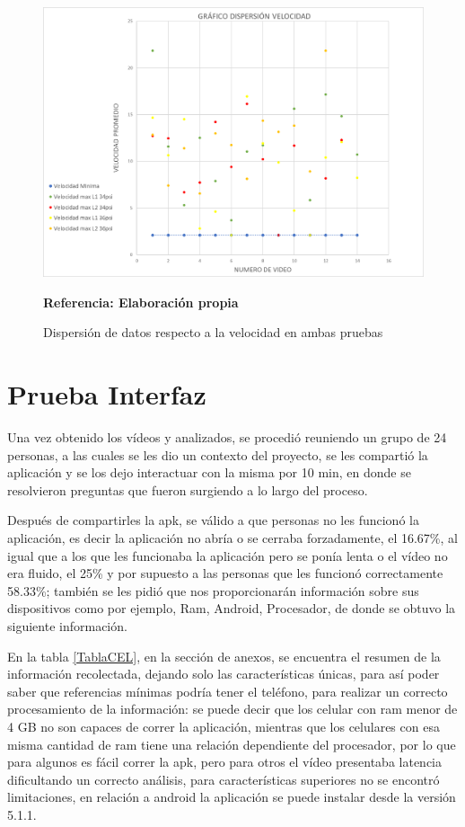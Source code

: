 \documentclass[12pt,twocolumn,a4paper]{article}
\begin{document}
\begin{figure}[h!]

	\centering
	\includegraphics[scale=0.4]{Dispvel.png}
	\caption{Dispersión de datos respecto a la velocidad en ambas pruebas } \textbf{Referencia: Elaboración propia} 
	\label{dispvel}
\end{figure}

\section{Prueba Interfaz}

Una vez obtenido los vídeos y analizados, se procedió reuniendo un grupo de 24 personas, a las cuales se les dio un contexto del proyecto, se les compartió la aplicación y se los dejo interactuar con la misma por 10 min, en donde se resolvieron preguntas que fueron surgiendo a lo largo del proceso.

Después de compartirles la apk, se válido a que personas no les funcionó la aplicación, es decir  la aplicación no abría o se cerraba forzadamente, el 16.67\%, al igual que a los que les funcionaba la aplicación pero se ponía lenta o el vídeo no era fluido, el 25\% y por supuesto a las personas que les funcionó correctamente 58.33\%; también se les pidió que nos proporcionarán información sobre sus dispositivos como por ejemplo, Ram, Android, Procesador, de donde se obtuvo la siguiente información.



En la tabla \ref{TablaCEL}, en la sección de anexos, se  encuentra el resumen de la información recolectada, dejando solo las características únicas, para así poder saber  que referencias mínimas podría tener el teléfono, para realizar un correcto procesamiento de la información: se puede decir que los celular con ram menor de 4 GB no son capaces de correr la aplicación, mientras que los celulares con esa misma cantidad de ram tiene una relación dependiente del procesador, por lo que para algunos es fácil correr la apk, pero para otros el vídeo presentaba latencia dificultando un correcto análisis, para características superiores no se encontró limitaciones, en relación a android la aplicación se puede instalar desde la versión 5.1.1.
\end{document}
